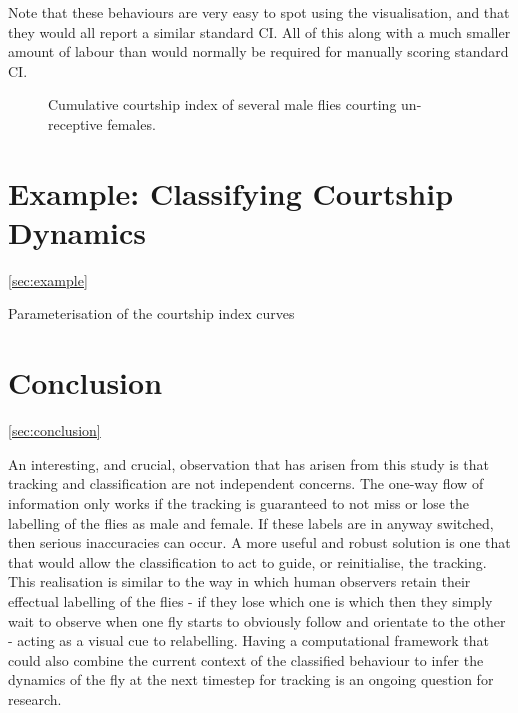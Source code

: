 \documentclass[twocolumn]{article}
\begin{document}
Note that these behaviours are very easy to spot using the visualisation, and that they would all report a similar standard CI. All of this along with a much smaller amount of labour than would normally be required for manually scoring standard CI.

\begin{figure}
	\caption{Cumulative courtship index of several male flies courting un-receptive females.}
	\label{fig:CCI}
\end{figure}

\section{Example: Classifying Courtship Dynamics}
\ref{sec:example}

Parameterisation of the courtship index curves


\section{Conclusion}
\ref{sec:conclusion}

An interesting, and crucial, observation that has arisen from this study is that tracking and classification are not independent concerns. The one-way flow of information only works if the tracking is guaranteed to not miss or lose the labelling of the flies as male and female. If these labels are in anyway switched, then serious inaccuracies can occur. A more useful and robust solution is one that that would allow the classification to act to guide, or reinitialise, the tracking. This realisation is similar to the way in which human observers retain their effectual labelling of the flies - if they lose which one is which then they simply wait to observe when one fly starts to obviously follow and orientate to the other - acting as a visual cue to relabelling. Having a computational framework that could also combine the current context of the classified behaviour to infer the dynamics of the fly at the next timestep for tracking is an ongoing question for research.
\end{document}
